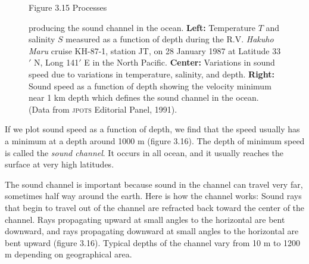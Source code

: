 \begin{figure}[t!]
\footnotesize
Figure 3.15 Processes \rule{0pt}{4ex}producing the sound
channel in the ocean.  \textbf{Left:} Temperature
$T$ and salinity $S$ measured as a function of depth during the R.V.
\textit{Hakuho Maru} cruise KH-87-1, station JT, on 28 January 1987 at
Latitude 33$'$ N, Long 141$'$ E in the
North Pacific.  \textbf{Center:} Variations in sound
speed due to variations in
temperature, salinity, and depth. \textbf{Right:} Sound
speed as a function of depth
showing the velocity minimum near 1 km depth which defines the sound
channel in the ocean. (Data from \textsc{jpots}
Editorial Panel, 1991).
\label{fig:soundprofile}
\vspace{-3ex}
\end{figure}

If we plot sound speed as a
function of depth, we find that the speed usually has a minimum at a
depth around 1000 m (figure 3.16). The depth of minimum speed is
called the \textit{sound channel}. It
occurs in all ocean, and it usually reaches the surface at very high
latitudes.

The sound channel is important because sound in
the channel can travel very far, sometimes half way around the
earth. Here is how the channel works: Sound rays
that begin to travel out of the channel are refracted back toward the
center of the channel. Rays propagating upward at small angles to the
horizontal are bent downward, and rays propagating downward at small
angles to the horizontal are bent upward (figure 3.16). Typical depths
of the chan\-nel vary from 10 m to 1200 m depending on geographical
area.


